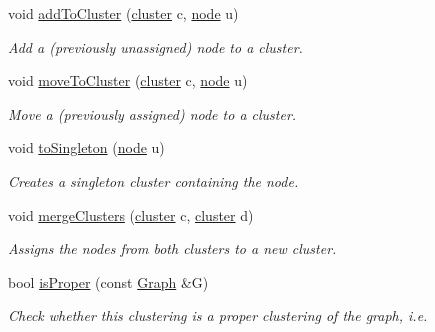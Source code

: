 \begin{DoxyCompactItemize}
void \hyperlink{class_ensemble_clustering_1_1_clustering_a2f6334480e3938deae8425dc57e6ea86}{add\-To\-Cluster} (\hyperlink{namespace_ensemble_clustering_a5ae38234e207add524443be6e597b970}{cluster} c, \hyperlink{namespace_ensemble_clustering_ae829290aeccd1a420b17a37fd901f114}{node} u)
\begin{DoxyCompactList}\small\item\em Add a (previously unassigned) node to a cluster. \end{DoxyCompactList}\item 
void \hyperlink{class_ensemble_clustering_1_1_clustering_a7e3a719ed9904897617a3152bf80a634}{move\-To\-Cluster} (\hyperlink{namespace_ensemble_clustering_a5ae38234e207add524443be6e597b970}{cluster} c, \hyperlink{namespace_ensemble_clustering_ae829290aeccd1a420b17a37fd901f114}{node} u)
\begin{DoxyCompactList}\small\item\em Move a (previously assigned) node to a cluster. \end{DoxyCompactList}\item 
void \hyperlink{class_ensemble_clustering_1_1_clustering_a461a251d674b64cf29e97408c343253a}{to\-Singleton} (\hyperlink{namespace_ensemble_clustering_ae829290aeccd1a420b17a37fd901f114}{node} u)
\begin{DoxyCompactList}\small\item\em Creates a singleton cluster containing the node. \end{DoxyCompactList}\item 
void \hyperlink{class_ensemble_clustering_1_1_clustering_a1cfe6fb096bef4aeb7814877847e2df9}{merge\-Clusters} (\hyperlink{namespace_ensemble_clustering_a5ae38234e207add524443be6e597b970}{cluster} c, \hyperlink{namespace_ensemble_clustering_a5ae38234e207add524443be6e597b970}{cluster} d)
\begin{DoxyCompactList}\small\item\em Assigns the nodes from both clusters to a new cluster. \end{DoxyCompactList}\item 
bool \hyperlink{class_ensemble_clustering_1_1_clustering_aa5d19717228e6c6c74aedfc9dfd722fe}{is\-Proper} (const \hyperlink{class_ensemble_clustering_1_1_graph}{Graph} \&G)
\begin{DoxyCompactList}\small\item\em Check whether this clustering is a proper clustering of the graph, i.\-e. \end{DoxyCompactList}\item 

\end{DoxyCompactItemize}
